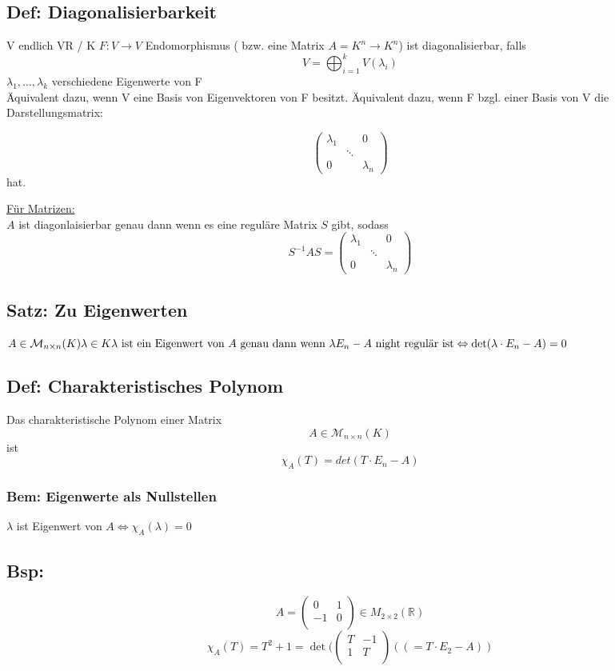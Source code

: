 \documentclass[titlepage,12pt,a4paper,ngerman]{report}
\begin{document}
\subsection{Def: Diagonalisierbarkeit} V endlich VR / K
$ F: V \to V$ Endomorphismus ( bzw. eine Matrix $A = K^n \to K^n$) ist diagonalisierbar, falls 
$$V = \bigoplus_{i=1}^{k} V(\lambda_i) $$
$\lambda_1, \dots , \lambda_k $ verschiedene Eigenwerte von F\\
Äquivalent dazu, wenn V eine Basis von Eigenvektoren von F besitzt. Äquivalent dazu, wenn F bzgl. einer Basis von V die  \\
Darstellungsmatrix:

$$\begin{pmatrix}
\lambda_1 & & 0 \\
& \ddots & \\
0 & & \lambda_n
\end{pmatrix}$$
hat.

\underline{Für Matrizen:}\\
$A$ ist diagonlaisierbar genau dann wenn es eine reguläre Matrix $S$ gibt, sodass $$S^{-1}AS=
\begin{pmatrix}
\lambda_1 & & 0 \\
& \ddots & \\
0 & & \lambda_n
\end{pmatrix}$$
\subsection{Satz: Zu Eigenwerten}$ A \in \mathcal{M}_{n \times n}(K)\\
\lambda \in K\\
\lambda \textrm{ ist ein Eigenwert von } A \textrm{ genau dann wenn } \\
\lambda E_n - A \textrm{ night regulär ist} \Leftrightarrow \textrm{det}(\lambda \cdot E_n - A) = 0 $

\subsection{Def: Charakteristisches Polynom} Das charakteristische Polynom einer Matrix
$$ A\in \mathcal{M}_{n\times n}(K)$$ ist 
$$\chi_A (T) = det(T\cdot E_n -A)$$
\subsubsection{Bem: Eigenwerte als Nullstellen} $\lambda$ ist Eigenwert von $A \Leftrightarrow \chi _A (\lambda) = 0 $
\subsection{Bsp:} 
$$A = \begin{pmatrix}
0 & 1\\
-1 & 0\\
\end{pmatrix} \in M_{2\times 2} (\mathbb{R})$$
$$\chi_A (T) = T^2 + 1 = \det(\begin{pmatrix}
T & -1\\
1 & T\\
\end{pmatrix} ((= T \cdot E_2 - A))$$
\end{document}
